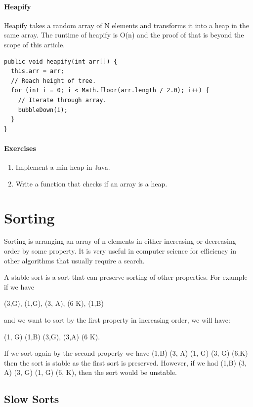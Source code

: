 \documentclass[11pt,oneside]{book}
\begin{document}
\subsection{Heapify}

Heapify takes a random array of N elements and transforms it into a heap in the same array. The runtime of heapify is O(n) and the proof of that is beyond the scope of this article.

\begin{lstlisting}
public void heapify(int arr[]) {
  this.arr = arr;
  // Reach height of tree.
  for (int i = 0; i < Math.floor(arr.length / 2.0); i++) {
    // Iterate through array.
    bubbleDown(i);
  }
}
\end{lstlisting}

\subsection{Exercises}

\begin{enumerate}
\item Implement a min heap in Java.
\item Write a function that checks if an array is a heap. 
\end{enumerate}

\part{ Sorting }
    

Sorting is arranging an array of n elements in either increasing or decreasing order by some property. It is very useful in computer science for efficiency in other algorithms that usually require a search.

A stable sort is a sort that can preserve sorting of other properties. For example if we have

(3,G), (1,G), (3, A), (6 K), (1,B)

and we want to sort by the first property in increasing order, we will have:

(1, G) (1,B) (3,G), (3,A) (6 K).

If we sort again by the second property we have (1,B) (3, A) (1, G) (3, G) (6,K) then the sort is stable as the first sort is preserved. However, if we had (1,B) (3, A) (3, G) (1, G) (6, K), then the sort would be unstable.


    \chapter{ Slow Sorts }
        
\end{document}
